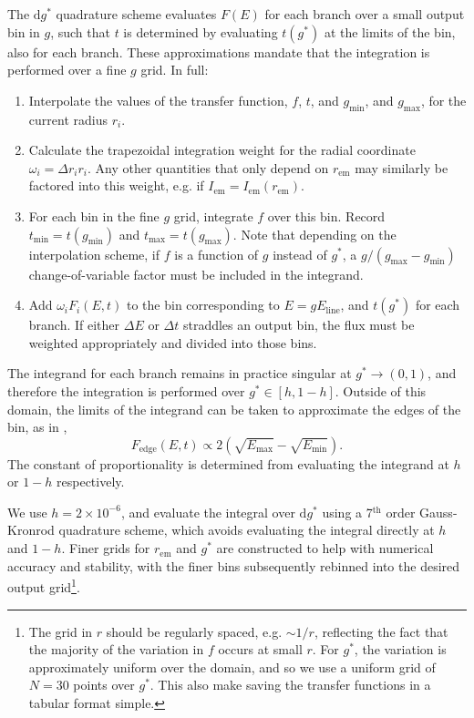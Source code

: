 \documentclass[fleqn,usenatbib]{mnras}
\renewcommand{\d}{\text{d}}
\begin{document}
The $\d g^\ast$ quadrature scheme evaluates $F(E)$ for each branch over a small
output bin in $g$, such that $t$ is determined by evaluating $t(g^\ast)$ at the
limits of the bin, also for each branch. These approximations mandate that the
integration is performed over a fine $g$ grid. In full:
\begin{enumerate}
    \item Interpolate the values of the transfer function, $f$, $t$, and
        $g_\text{min}$, and $g_\text{max}$, for the current radius $r_i$.
    \item Calculate the trapezoidal integration weight for the radial coordinate
        $\omega_i = \Delta r_i r_i$. Any other quantities that only depend on
        $r_\text{em}$ may similarly be factored into this weight, e.g. if
        $I_\text{em} = I_\text{em}(r_\text{em})$.
    \item For each bin in the fine $g$ grid, integrate $f$ over this bin. Record
        $t_\text{min} = t(g_\text{min})$ and $t_\text{max} = t(g_\text{max})$.
        Note that depending on the interpolation scheme, if $f$ is a function of
        $g$ instead of $g^\ast$, a $g / (g_\text{max} - g_\text{min})$
        change-of-variable factor must be included in the integrand.
    \item Add $\omega_i F_i(E, t)$ to the bin corresponding to $E =
        gE_\text{line}$, and $t(g^\ast)$ for each branch. If either $\Delta E$
        or $\Delta t$ straddles an output bin, the flux must be weighted
        appropriately and divided into those bins.
\end{enumerate}

The integrand for each branch remains in practice singular at $g^\ast
\rightarrow (0, 1)$, and therefore the integration is performed over $g^\ast \in
[h, 1 - h]$. Outside of this domain, the limits of the integrand can be taken to
approximate the edges of the bin, as in \cite{dauser_broad_2010},
\begin{equation} F_\text{edge}(E,t) \propto 2\left( \sqrt{E_\text{max}} -
\sqrt{E_\text{min}} \right).  \end{equation} The constant of proportionality is
determined from evaluating the integrand at $h$ or $1 - h$ respectively.

We use $h = 2 \times 10^{-6}$, and evaluate the integral over $\d g^\ast$ using
a 7$^\text{th}$ order Gauss-Kronrod quadrature scheme, which avoids evaluating
the integral directly at $h$ and $1 - h$. Finer grids for $r_\text{em}$
and $g^\ast$ are constructed to help with numerical accuracy and stability, with
the finer bins subsequently rebinned into the desired output grid\footnote{The
    grid in $r$ should be regularly spaced, e.g. $\sim 1 / r$, reflecting the
    fact that the majority of the variation in $f$ occurs at small $r$. For
$g^\ast$, the variation is approximately uniform over the domain, and so we use
a uniform grid of $N = 30$ points over $g^\ast$. This also make saving the
transfer functions in a tabular format simple.  }.
\end{document}
